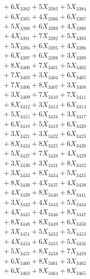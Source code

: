 \documentclass[a4paper,10pt]{article}
\begin{document}
{\begin{align}
&\;  + 6 X_{3382} + 5 X_{3383} + 5 X_{3384} \\[0.3ex]
&\;  + 6 X_{3385} + 4 X_{3386} + 6 X_{3387} \\[0.3ex]
&\;  + 5 X_{3388} + 6 X_{3389} + 4 X_{3390} \\[0.3ex]
&\;  + 4 X_{3391} + 7 X_{3392} + 5 X_{3393} \\[0.3ex]
&\;  + 5 X_{3394} + 6 X_{3395} + 4 X_{3396} \\[0.3ex]
&\;  + 6 X_{3397} + 6 X_{3398} + 3 X_{3399} \\[0.5ex]\allowbreak
&\;  + 8 X_{3400} + 7 X_{3401} + 5 X_{3402} \\[0.3ex]
&\;  + 7 X_{3403} + 3 X_{3404} + 6 X_{3405} \\[0.3ex]
&\;  + 7 X_{3406} + 8 X_{3407} + 3 X_{3408} \\[0.3ex]
&\;  + 3 X_{3409} + 7 X_{3410} + 7 X_{3411} \\[0.3ex]
&\;  + 8 X_{3412} + 3 X_{3413} + 6 X_{3414} \\[0.3ex]
&\;  + 5 X_{3415} + 6 X_{3416} + 3 X_{3417} \\[0.3ex]
&\;  + 6 X_{3418} + 5 X_{3419} + 6 X_{3420} \\[0.3ex]
&\;  + 3 X_{3421} + 3 X_{3422} + 6 X_{3423} \\[0.3ex]
&\;  + 8 X_{3424} + 8 X_{3425} + 6 X_{3426} \\[0.3ex]
&\;  + 5 X_{3427} + 7 X_{3428} + 4 X_{3429} \\[0.5ex]\allowbreak
&\;  + 3 X_{3430} + 3 X_{3431} + 8 X_{3432} \\[0.3ex]
&\;  + 3 X_{3433} + 8 X_{3434} + 5 X_{3435} \\[0.3ex]
&\;  + 8 X_{3436} + 4 X_{3437} + 4 X_{3438} \\[0.3ex]
&\;  + 4 X_{3439} + 8 X_{3440} + 8 X_{3441} \\[0.3ex]
&\;  + 3 X_{3442} + 4 X_{3443} + 5 X_{3444} \\[0.3ex]
&\;  + 4 X_{3445} + 4 X_{3446} + 8 X_{3447} \\[0.3ex]
&\;  + 8 X_{3448} + 8 X_{3449} + 6 X_{3450} \\[0.3ex]
&\;  + 3 X_{3451} + 5 X_{3452} + 5 X_{3453} \\[0.3ex]
&\;  + 4 X_{3454} + 6 X_{3455} + 5 X_{3456} \\[0.3ex]
&\;  + 5 X_{3457} + 8 X_{3458} + 7 X_{3459} \\[0.5ex]\allowbreak
&\;  + 6 X_{3460} + 8 X_{3461} + 3 X_{3462} \\[0.3ex]
&\;  + 6 X_{3463} + 8 X_{3464} + 8 X_{3465} \\[0.3ex]

\end{align}}
\end{document}
